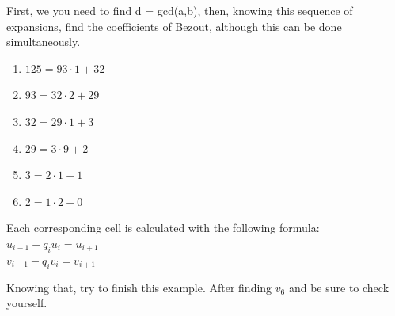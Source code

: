 \documentclass[../lecture-notes.tex]{subfiles}
\begin{document}
\begin{example} 
    \hfill

    First, we you need to find d = gcd(a,b), then, knowing this sequence of expansions, find the coefficients of Bezout, although this can be done simultaneously.

    \hfill

    \begin{minipage}{0.4\textwidth}
        \raggedright
        \vspace*{\fill}
            \begin{enumerate}
                \item $125 = 93 \cdot 1 + 32$
                \item $93 = 32 \cdot 2 + 29$
                \item $32 = 29 \cdot 1 + 3$
                \item $29 = 3 \cdot 9 + 2$
                \item $3 = 2 \cdot 1 + 1$
                \item $2 = 1 \cdot 2 + 0$        
            \end{enumerate}
        \vspace*{\fill}
    \end{minipage}
    \begin{minipage}{0.7\textwidth}
    \end{minipage}

    \hfill
    
    Each corresponding cell is calculated with the following formula: \\
    $u_{i-1} - q_i u_i = u_{i+1}$ \\
    $v_{i-1} - q_i v_i = v_{i+1}$ 

    Knowing that, try to  finish this example. After finding $v_6$ and be sure to check yourself.
\end{example}
\end{document}

